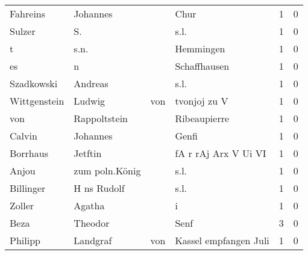 \begin{tabular}{llllrr}
                 Fahreins &                           Johannes &             &                                        Chur &          1 &         0 \\
                   Sulzer &                                 S. &             &                                        s.l. &          1 &         0 \\
                        t &                               s.n. &             &                                   Hemmingen &          1 &         0 \\
                       es &                                  n &             &                                Schaffhausen &          1 &         0 \\
               Szadkowski &                            Andreas &             &                                        s.l. &          1 &         0 \\
             Wittgenstein &                             Ludwig &         von &                                tvonjoj zu V &          1 &         0 \\
                      von &                       Rappoltstein &             &                                Ribeaupierre &          1 &         0 \\
                   Calvin &                           Johannes &             &                                       Genfi &          1 &         0 \\
                 Borrhaus &                            Jetftin &             &                        fA r rAj Arx V Ui VI &          1 &         0 \\
                    Anjou &                     zum poln.König &             &                                        s.l. &          1 &         0 \\
                Billinger &                        H ns Rudolf &             &                                        s.l. &          1 &         0 \\
                   Zoller &                             Agatha &             &                                           i &          1 &         0 \\
                     Beza &                            Theodor &             &                                        Senf &          3 &         0 \\
                  Philipp &                           Landgraf &         von &                       Kassel empfangen Juli &          1 &         0 \\

\end{tabular}
